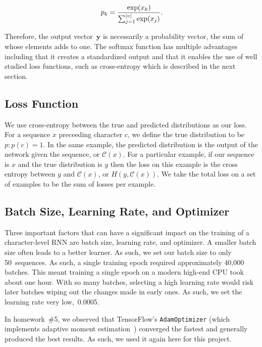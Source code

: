\documentclass{article}
\DeclarePairedDelimiter\abs{\lvert}{\rvert}%
\begin{document}
\begin{equation}
  p_k = \frac{\exp(x_k)}{\sum_{j=1}^{\abs*{v}} \exp(x_j)}\textrm{.}
\end{equation}

Therefore, the output vector~$\mathbf{y}$ is necessarily a probability vector, the sum of whose elements adds to one. The softmax function has multiple advantages including that it creates a standardized output and that it enables the use of well studied loss functions, such as cross-entropy which is described in the next section.

\subsection{Loss Function}

We use cross-entropy between the true and predicted distributions as our loss. For a sequence $x$ preceeding character $c$, we define the true distribution to be $p: p(c) = 1$. In the same example, the predicted distribution is the output of the network given the sequence, or $\mathcal{C}(x)$. For a particular example, if our sequence is $x$ and the true distribution is $y$ then the loss on this example is the cross entropy between $y$ and $\mathcal{C}(x)$, or $H(y, \mathcal{C}(x))$. We take the total loss on a set of examples to be the sum of losses per example.

\subsection{Batch Size, Learning Rate, and Optimizer}

Three important factors that can have a significant impact on the training of a character-level RNN are batch size, learning rate, and optimizer.  A smaller batch size often leads to a better learner.  As such, we set our batch size to only 50~sequences.  As such, a single training epoch required approximately 40,000 batches. This meant training a single epoch on a modern high-end CPU took about one hour.  With so many batches, selecting a high learning rate would risk later batches wiping out the changes made in early ones.  As such, we set the learning rate very low,~0.0005. 

In homework~\#5, we observed that TensorFlow's \texttt{AdamOptimizer} (which implements adaptive moment estimation~\cite{kingma2014}) converged the fastest and generally produced the best results.  As such, we used it again here for this project.  
\end{document}
